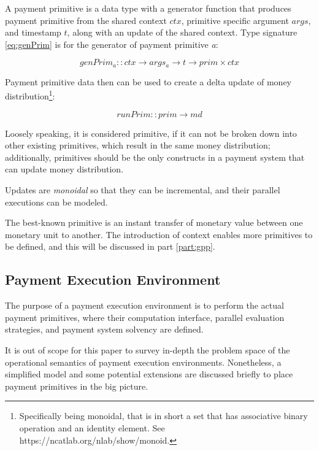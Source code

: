 A payment primitive is a data type with a generator function that produces payment primitive from
the shared context $ctx$, primitive specific argument $args$, and timestamp $t$, along with an update
of the shared context. Type signature \ref{eq:genPrim} is for the generator of payment
primitive \textit{a}:

\begin{equation}\label{eq:genPrim}
    genPrim_a :: ctx \rightarrow args_a \rightarrow t \rightarrow prim \times ctx
\end{equation}

Payment primitive data then can be used to create a delta update of money
distribution\footnote{Specifically being monoidal, that is in short a set that has associative
binary operation and an identity element. See https://ncatlab.org/nlab/show/monoid.}:

\begin{equation}
    runPrim :: prim \rightarrow md
\end{equation}

Loosely speaking, it is considered primitive, if it can not be broken down into other existing
primitives, which result in the same money distribution; additionally, primitives should be the only
constructs in a payment system that can update money distribution.

Updates are \textit{monoidal} so that they can be incremental, and their parallel executions can be
modeled.

The best-known primitive is an instant transfer of monetary value between one monetary unit to
another. The introduction of context enables more primitives to be defined, and this will be
discussed in part \ref{part:gpp}.

\subsection{Payment Execution Environment}

The purpose of a payment execution environment is to perform the actual payment primitives, where
their computation interface, parallel evaluation strategies, and payment system solvency are defined.

It is out of scope for this paper to survey in-depth the problem space of the operational semantics
of payment execution environments. Nonetheless, a simplified model and some potential extensions are
discussed briefly to place payment primitives in the big picture.

